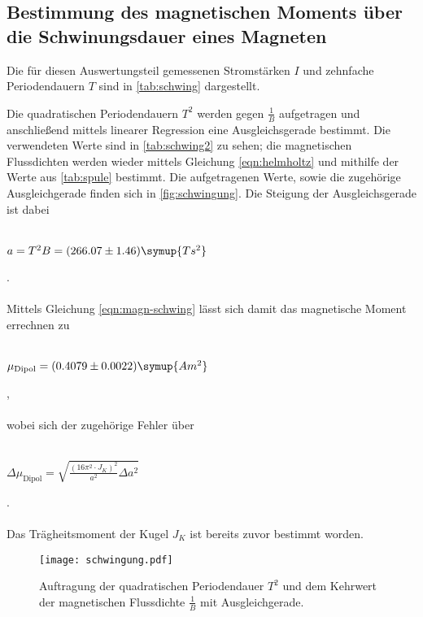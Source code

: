 \subsection{Bestimmung des magnetischen Moments über die Schwinungsdauer eines Magneten}
    Die für diesen Auswertungsteil gemessenen Stromstärken $I$ und zehnfache Periodendauern $T$ sind in \autoref{tab:schwing} dargestellt.
    
   
    Die quadratischen Periodendauern $T^2$ werden gegen $\frac{1}{B}$ aufgetragen und anschließend mittels linearer Regression eine
    Ausgleichsgerade bestimmt. 
    Die verwendeten Werte sind in \autoref{tab:schwing2} zu sehen; die magnetischen Flussdichten werden wieder mittels Gleichung
    \eqref{eqn:helmholtz} und mithilfe der Werte aus \autoref{tab:spule} bestimmt.
    Die aufgetragenen Werte, sowie die zugehörige Ausgleichgerade finden sich in \autoref{fig:schwingung}.
    Die Steigung der Ausgleichsgerade ist dabei 
    \\ \\
    \centerline{$a = T^2 B = (266.07 \pm 1.46) \symup{T s^2} $}.
    \\ \\
    Mittels Gleichung \eqref{eqn:magn-schwing} lässt sich damit das magnetische Moment errechnen zu
    \\ \\
    \centerline{$\mu_\text{Dipol} = (0.4079 \pm 0.0022) \symup{A m^2}$},
    \\ \\
    wobei sich der zugehörige Fehler über 
    \\ \\
    \centerline{$\Delta \mu_\text{Dipol} = \sqrt{\frac{(16 \pi^2 \cdot J_K)^2}{a^2} \Delta a^2 }  $}.
    \\ \\
    Das Trägheitsmoment der Kugel $J_K$ ist bereits zuvor bestimmt worden.
    
    \begin{figure}
        \centering
        \texttt{[image: schwingung.pdf]}
        \caption{Auftragung der quadratischen Periodendauer $T^2$ und dem Kehrwert der magnetischen Flussdichte $\frac{1}{B}$ mit Ausgleichgerade.}
        \label{fig:schwingung}
    \end{figure}

